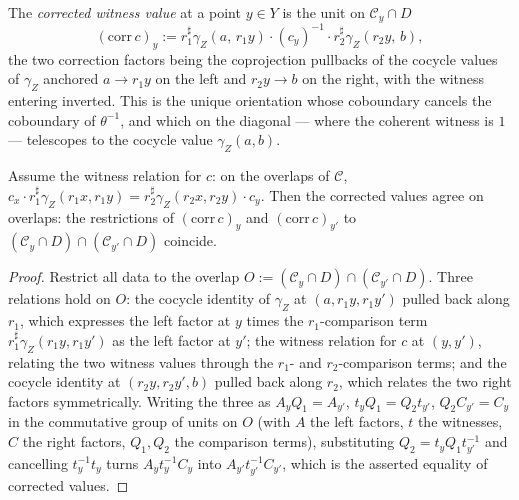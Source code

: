 \begin{definition}
  \label{pa-def:unitsCorrCochain}
  \leanok

  The \emph{corrected witness value} at a point \(y \in Y\) is the unit on
  \(\mathcal C_y \cap D\)
  \[
    (\mathrm{corr}\,c)_y := r_1^{\sharp}\gamma_Z(a,\, r_1 y) \cdot (c_y)^{-1} \cdot
      r_2^{\sharp}\gamma_Z(r_2 y,\, b) ,
  \]
  the two correction factors being the coprojection pullbacks of the cocycle values of
  \(\gamma_Z\) anchored \(a \to r_1 y\) on the left and \(r_2 y \to b\) on the right, with the
  witness entering inverted. This is the unique orientation whose coboundary cancels the
  coboundary of \(\theta^{-1}\), and which on the diagonal — where the coherent witness is
  \(1\) — telescopes to the cocycle value \(\gamma_Z(a, b)\).
\end{definition}

\begin{theorem}
  \label{pa-thm:unitsCorrCochain_compat}
  \leanok

  Assume the witness relation for \(c\): on the overlaps of \(\mathcal C\),
  \(c_x \cdot r_1^{\sharp}\gamma_Z(r_1 x, r_1 y) = r_2^{\sharp}\gamma_Z(r_2 x, r_2 y) \cdot c_y\).
  Then the corrected values agree on overlaps: the restrictions of \((\mathrm{corr}\,c)_y\) and
  \((\mathrm{corr}\,c)_{y'}\) to \((\mathcal C_y \cap D) \cap (\mathcal C_{y'} \cap D)\)
  coincide.
\end{theorem}
\begin{proof}
  \leanok
  Restrict all data to the overlap \(O := (\mathcal C_y \cap D) \cap (\mathcal C_{y'} \cap D)\).
  Three relations hold on \(O\): the cocycle identity of \(\gamma_Z\) at \((a, r_1 y, r_1 y')\)
  pulled back along \(r_1\), which expresses the left factor at \(y\) times the
  \(r_1\)-comparison term \(r_1^{\sharp}\gamma_Z(r_1 y, r_1 y')\) as the left factor at \(y'\);
  the witness relation for \(c\) at \((y, y')\), relating the two witness values through the
  \(r_1\)- and \(r_2\)-comparison terms; and the cocycle identity at \((r_2 y, r_2 y', b)\)
  pulled back along \(r_2\), which relates the two right factors symmetrically. Writing the
  three as \(A_y Q_1 = A_{y'}\), \(t_y Q_1 = Q_2 t_{y'}\), \(Q_2 C_{y'} = C_y\) in the
  commutative group of units on \(O\) (with \(A\) the left factors, \(t\) the witnesses, \(C\)
  the right factors, \(Q_1, Q_2\) the comparison terms), substituting \(Q_2 = t_y Q_1 t_{y'}^{-1}\)
  and cancelling \(t_y^{-1} t_y\) turns \(A_y t_y^{-1} C_y\) into \(A_{y'} t_{y'}^{-1} C_{y'}\),
  which is the asserted equality of corrected values.
\end{proof}

